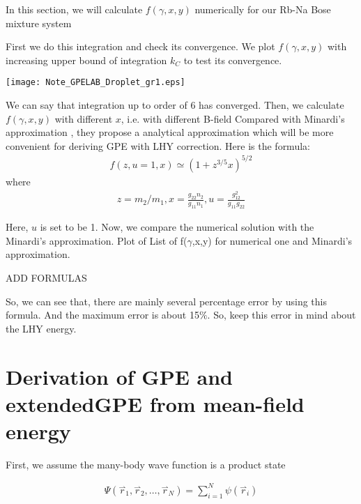 In this section, we will calculate \(f(\gamma ,x,y)\) numerically for our Rb-Na Bose mixture system

First we do this integration and check its convergence. We plot \(f(\gamma ,x,y)\) with increasing upper bound of integration \(k_C\) to test its
convergence.

\texttt{[image: Note\_GPELAB\_Droplet\_gr1.eps]}

We can say that integration up to order of 6 has converged. 
Then, we calculate \(f(\gamma ,x,y)\) with different \(x\), i.e. with different B-field Compared with Minardi{'}s approximation \cite{Minardi2019}, they propose a analytical approximation which will be more convenient for deriving GPE with LHY correction. Here is the formula:
\begin{equation}
\begin{split}
f(z,u=1,x)\simeq \left(1+z^{3/5}x\right)^{5/2}
\end{split}
\end{equation}
where
\begin{equation}
\begin{split}
z=m_2/m_1, x=\frac{g_{22}n_2}{g_{11}n_1},u=\frac{g_{12}^2}{g_{11}g_{22}}
\end{split}
\end{equation}

Here, \(u\) is set to be 1.
Now, we compare the numerical solution with the Minardi{'}s approximation.
Plot of List of f($\gamma $,x,y) for numerical one and Minardi{'}s approximation.

ADD FORMULAS

So, we can see that, there are mainly several percentage error by using this formula. And the maximum error is about 15$\%$. So, keep this error in mind about the LHY energy.

\section{Derivation of GPE and extendedGPE from mean-field energy}

First, we assume the many-body wave function is a product state

\begin{equation}
\begin{split}
\Psi \left(\overset{\rightharpoonup }{r}_1,\overset{\rightharpoonup }{r}_2,\ldots  ,\overset{\rightharpoonup }{r}_N\right)=\sum _{i=1}^N \psi \left(\overset{\rightharpoonup
}{r}_i\right)
\end{split}
\end{equation}

